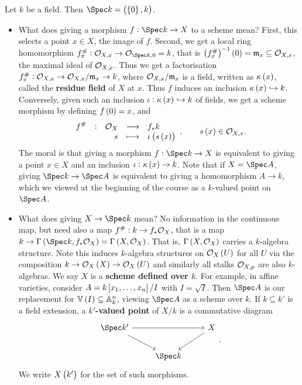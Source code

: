 \begin{example*}
Let $ k $ be a field. Then $ \Spec k = \br{\cbr{0}, k} $.
\begin{itemize}
\item What does giving a morphism $ f : \Spec k \to X $ to a scheme mean? First, this selects a point $ x \in X $, the image of $ f $. Second, we get a local ring homomorphism $ f_x^\# : \OOO_{X, x} \to \OOO_{\Spec k, 0} = k $, that is $ \br{f_x^\#}^{-1}\br{0} = \mmm_x \subseteq \OOO_{X, x} $, the maximal ideal of $ \mathcal{O}_{X, x} $. Thus we get a factorisation $ f_x^\# : \mathcal{O}_{X, x} \to \mathcal{O}_{X, x} / \mathfrak{m}_x \to k $, where $ \mathcal{O}_{X, x} / \mathfrak{m}_x $ is a field, written as $ \kappa\br{x} $, called the \textbf{residue field} of $ X $ at $ x $. Thus $ f $ induces an inclusion $ \kappa\br{x} \hookrightarrow k $. Conversely, given such an inclusion $ \iota : \kappa\br{x} \hookrightarrow k $ of fields, we get a scheme morphism by defining $ f\br{0} = x $, and
$$ \function[f^\#]{\OOO_X}{f_*k}{s}{\iota\br{s\br{x}}}, \qquad s\br{x} \in \OOO_{X, x}. $$
The moral is that giving a morphism $ f : \Spec k \to X $ is equivalent to giving a point $ x \in X $ and an inclusion $ \iota : \kappa\br{x} \to k $. Note that if $ X = \Spec A $, giving $ \Spec k \to \Spec A $ is equivalent to giving a homomorphism $ A \to k $, which we viewed at the beginning of the course as a $ k $-valued point on $ \Spec A $.


\item What does giving $ X \to \Spec k $ mean? No information in the continuous map, but need also a map $ f^\# : k \to f_*\mathcal{O}_X $, that is a map $ k \to \Gamma\br{\Spec k, f_*\OOO_X} = \Gamma\br{X, \OOO_X} $. That is, $ \Gamma\br{X, \OOO_X} $ carries a $ k $-algebra structure. Note this induces $ k $-algebra structures on $ \OOO_X\br{U} $ for all $ U $ via the composition $ k \to \OOO_X\br{X} \to \OOO_X\br{U} $ and similarly all stalks $ \mathcal{O}_{X, p} $ are also $ k $-algebras. We say $ X $ is a \textbf{scheme defined over $ k $}. For example, in affine varieties, consider $ A = k\sbr{x_1, \dots, x_n} / I $ with $ I = \sqrt{I} $. Then $ \Spec A $ is our replacement for $ \VV\br{I} \subseteq \AA_k^n $, viewing $ \Spec A $ as a scheme over $ k $. If $ k \subseteq k' $ is a field extension, a \textbf{$ k' $-valued point} of $ X / k $ is a commutative diagram
$$
\begin{tikzcd}
\Spec k' \arrow{rr} \arrow{dr} & & X \arrow{dl} \\
& \Spec k &
\end{tikzcd}.
$$
We write $ X\br{k'} $ for the set of such morphisms.
\end{itemize}
\end{example*}

